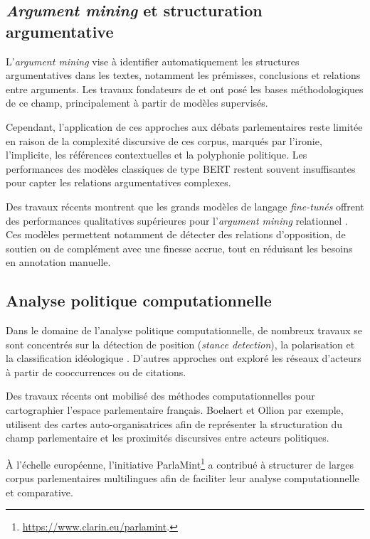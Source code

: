 \documentclass[final, fra]{anthology-ch}      %
\begin{document}
\subsection{\textit{Argument mining} et structuration argumentative}

L’\textit{argument mining }vise à identifier automatiquement les structures argumentatives dans les textes, notamment les prémisses, conclusions et relations entre arguments. Les travaux fondateurs de \cite{peldszus2015} et \cite{lippi2016} ont posé les bases méthodologiques de ce champ, principalement à partir de modèles supervisés.

Cependant, l’application de ces approches aux débats parlementaires reste limitée en raison de la complexité discursive de ces corpus, marqués par l’ironie, l’implicite, les références contextuelles et la polyphonie politique. Les performances des modèles classiques de type BERT restent souvent insuffisantes pour capter les relations argumentatives complexes.

Des travaux récents montrent que les grands modèles de langage \textit{fine-tunés} offrent des performances qualitatives supérieures pour l’\textit{argument mining} relationnel \cite{gorur2025, cabessa2025, chen2024}. Ces modèles permettent notamment de détecter des relations d’opposition, de soutien ou de complément avec une finesse accrue, tout en réduisant les besoins en annotation manuelle.

\subsection{Analyse politique computationnelle}

Dans le domaine de l’analyse politique computationnelle, de nombreux travaux se sont concentrés sur la détection de position (\textit{stance detection}), la polarisation et la classification idéologique \cite{grimmer2013, conover2011}. D’autres approches ont exploré les réseaux d’acteurs à partir de cooccurrences ou de citations.

Des travaux récents ont mobilisé des méthodes computationnelles pour cartographier l’espace parlementaire français. Boelaert et Ollion \cite{ollion2020} par exemple, utilisent des cartes auto-organisatrices afin de représenter la structuration du champ parlementaire et les proximités discursives entre acteurs politiques.

À l’échelle européenne, l’initiative ParlaMint\footnote{\url{https://www.clarin.eu/parlamint}.} a contribué à structurer de larges corpus parlementaires multilingues afin de faciliter leur analyse computationnelle et comparative.
\end{document}
